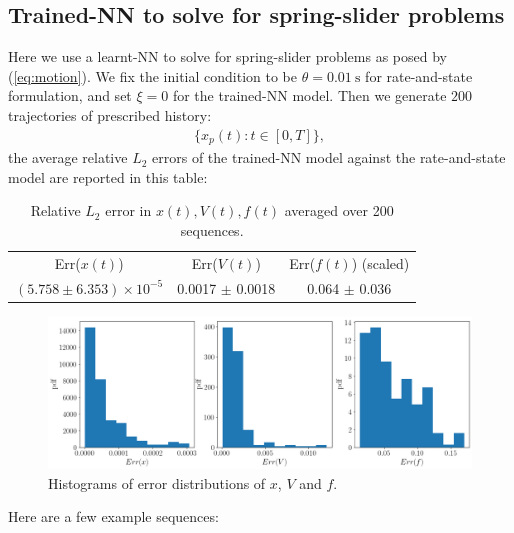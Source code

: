 \newpage
\subsection{Trained-NN to solve for spring-slider problems}
Here we use a learnt-NN to solve for spring-slider problems as posed by (\ref{eq:motion}). 
We fix the initial condition to be $\theta=0.01\ \mathrm{s}$ for rate-and-state formulation, 
and set $\xi=0$ for the trained-NN model. 
Then we generate $200$ trajectories of prescribed history:
\begin{align*}
    \{x_p(t) : t\in [0, T]\}, 
\end{align*}
the average relative $L_2$ errors of the trained-NN model against the rate-and-state model are reported in this table:
\begin{table}[H]
    \centering
    \begin{tabular}{ccc}
        \hline
        Err($x(t)$) & Err($V(t)$) & Err($f(t)$) (scaled) \\
        $(5.758 \pm 6.353) \times 10^{-5}$ & 0.0017 $\pm$ 0.0018
        & 0.064 $\pm$ 0.036\\
        \hline
    \end{tabular}
    \caption{Relative $L_2$ error in $x(t), V(t), f(t)$ averaged  over 200 sequences.}
    \label{tab:L2ErrorSpringSlider}
\end{table}
\begin{figure}[H]
    \centering
    \includegraphics[width=1.0\textwidth]{images/SpringSlider_Err_XVF_pdfs.png}
    \caption{Histograms of error distributions of $x$, $V$ and $f$.}
    \label{fig:SpringSliderErrXVFPdfs}
\end{figure}
Here are a few example sequences:
